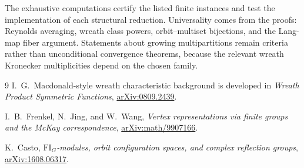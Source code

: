 \documentclass[10pt]{article}
\begin{document}
The exhaustive computations certify the listed finite instances and test the
implementation of each structural reduction.  Universality comes from the
proofs: Reynolds averaging, wreath class powers, orbit--multiset bijections,
and the Lang-map fiber argument.  Statements about growing multipartitions
remain criteria rather than unconditional convergence theorems, because the
relevant wreath Kronecker multiplicities depend on the chosen family.

\begin{thebibliography}{9}
I.~G.~Macdonald-style wreath characteristic background is developed in
\emph{Wreath Product Symmetric Functions},
\href{https://arxiv.org/abs/0809.2439}{arXiv:0809.2439}.

I.~B.~Frenkel, N.~Jing, and W.~Wang,
\emph{Vertex representations via finite groups and the McKay correspondence},
\href{https://arxiv.org/abs/math/9907166}{arXiv:math/9907166}.

K.~Casto,
\emph{$\mathrm{FI}_G$-modules, orbit configuration spaces, and complex
reflection groups},
\href{https://arxiv.org/abs/1608.06317}{arXiv:1608.06317}.
\end{thebibliography}

\clearpage
\end{document}
